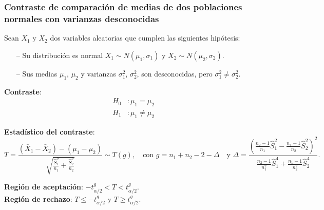 \begin{frame}
\frametitle{Contraste de comparación de medias de dos poblaciones normales con varianzas desconocidas}
Sean $X_1$ y $X_2$ dos variables aleatorias que cumplen las siguientes hipótesis:
\begin{itemize}
\item[--] Su distribución es normal $X_1\sim N(\mu_1,\sigma_1)$ y $X_2\sim N(\mu_2,\sigma_2)$.
\item[--] Sus medias $\mu_1$, $\mu_2$ y varianzas $\sigma_1^2$, $\sigma_2^2$, son desconocidas, pero $\sigma^2_1\not =
\sigma^2_2$.
\end{itemize}
\textbf{Contraste}:
\begin{align*} 
H_0 &: \mu_1=\mu_2\\
H_1 &: \mu_1\neq \mu_2
\end{align*}

\textbf{Estadístico del contraste}:
{\footnotesize
\[
T=\frac{(\bar{X}_1-\bar{X}_2)-(\mu_1-\mu_2)}{\sqrt{\frac{\hat{S}^2_1}{n_1}+\frac{\hat{S}^2_2}{n_2}}} \sim T(g),\quad
\text {con } g=n_1+n_2-2-\Delta\quad \text{y }
\Delta =
\frac{(\frac{n_2-1}{n_1}\hat{S}_1^2-\frac{n_1-1}{n_2}\hat{S}_2^2)^2}{\frac{n_2-1}{n_1^2}\hat{S}_1^4+\frac{n_1-1}{n_2^2}\hat{S}_2^4}.
\] 
}

\textbf{Región de aceptación}: $-t^{g}_{\alpha/2}< T < t^{g}_{\alpha/2}$.\\
\textbf{Región de rechazo}: $T\leq -t^{g}_{\alpha/2}$ y $T\geq t^{g}_{\alpha/2}$.
\end{frame}


